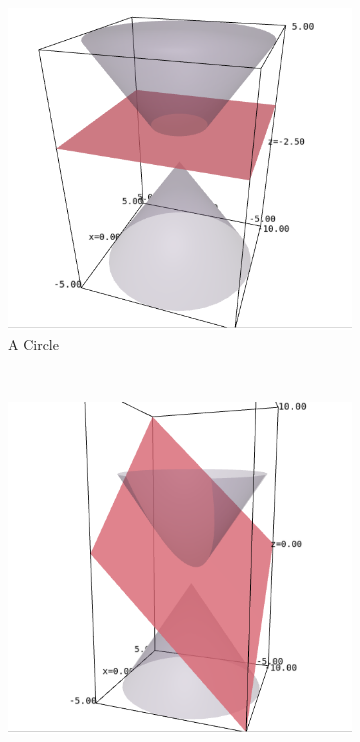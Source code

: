 \documentclass{article}
\theoremstyle{definition}
\begin{document}
\begin{figure}[H]
\centering
\begin{subfigure}[b]{0.3\textwidth}
\includegraphics[width=\textwidth]{Selection_050}
\caption{A Circle}
\label{fig:gull}
\end{subfigure}
~ %
\begin{subfigure}[b]{0.3\textwidth}
\includegraphics[width=\textwidth]{Selection_051}

\end{subfigure}
\end{figure}
\end{document}
